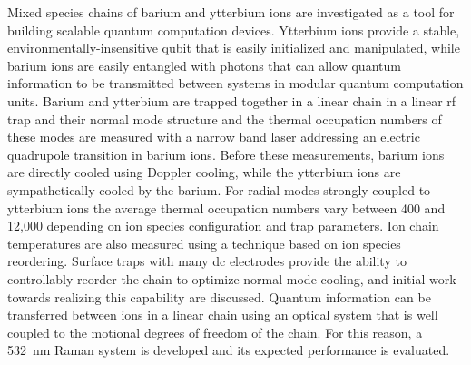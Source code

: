 Mixed species chains of barium and ytterbium ions are investigated as a tool for building scalable quantum computation devices.  Ytterbium ions provide a stable, environmentally-insensitive qubit that is easily initialized and manipulated, while barium ions are easily entangled with photons that can allow quantum information to be transmitted between systems in modular quantum computation units.  Barium and ytterbium are trapped together in a linear chain in a linear rf trap and their normal mode structure and the thermal occupation numbers of these modes are measured with a narrow band laser addressing an electric quadrupole transition in barium ions. Before these measurements, barium ions are directly cooled using Doppler cooling, while the ytterbium ions are sympathetically cooled by the barium.  For radial modes strongly coupled to ytterbium ions the average thermal occupation numbers vary between 400 and 12,000 depending on ion species configuration and trap parameters.  Ion chain temperatures are also measured using a technique based on ion species reordering.  Surface traps with many dc electrodes provide the ability to controllably reorder the chain to optimize normal mode cooling, and initial work towards realizing this capability are discussed.  Quantum information can be transferred between ions in a linear chain using an optical system that is well coupled to the motional degrees of freedom of the chain.  For this reason, a 532~nm Raman system is developed and its expected performance is evaluated.
